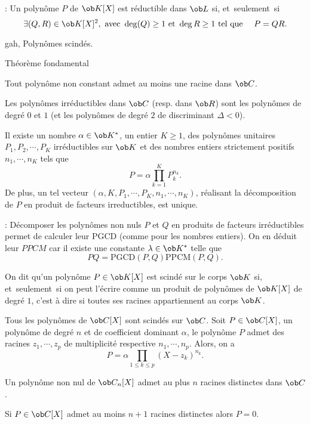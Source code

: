 \Remarque : Un polynôme $P$ de $\ob K[X]$ est réductible dans $\ob L$ si, et~seulement~si 
$$
\exists(Q,R)\in\ob K[X]^2, \mbox{ avec }\deg(Q)\ge1\mbox{ et } \deg R\ge1\mbox{ tel que }\quad P=QR.
$$
\medskip

\Subsection gah, Polynômes scindés.

\Concept [] Théorème fondamental

\Theoreme [Index=Theoreme@Théorème!de d'Alembert;Title=Théorème de d'Alembert-Gauss]  
Tout polynôme non constant admet au moins une racine dans $\ob C$. 

\Propriete []  Les polynômes irréductibles dans $\ob C$ (resp. dans $\ob R$) sont les polynômes de degré $0$ et $1$ (et les polynômes de degré $2$ de discriminant $\Delta<0$). 
\bigskip

\Theoreme [Title=Décomposition en facteurs irréductibles;$P$ polynôme non constant à coefficients dans $\ob K$ ] 
Il existe un nombre $\alpha\in\ob K^*$, un entier $K\ge1$, des polynômes unitaires $P_1,P_2,\cdots, P_K$ irréductibles sur $\ob K$ et des nombres entiers strictement positifs $n_1,\cdots, n_K$ tels que 
$$
P=\alpha\prod_{k=1}^K P_k^{n_k}. 
$$
De plus, un tel vecteur $(\alpha, K,P_1,\cdots, P_K, n_1,\cdots,n_K)$, réalisant la décomposition de $P$ en produit de facteurs irreductibles, est unique. 

\Remarque : Décomposer les polynômes non nuls $P$ et $Q$ en produits de facteurs irréductibles permet de calculer leur PGCD (comme pour les nombres entiers). 
On en déduit leur $PPCM$ car il existe une constante $\lambda\in\ob K^*$ telle que 
$$
PQ=\mbox{PGCD}(P,Q)\mbox{PPCM}(P,Q).
$$

\Definition []  On dit qu'un polynôme $P\in\ob K[X]$ est scindé sur le corps $\ob K$ si, et~seulement~si on peut l'écrire comme un produit de polynômes de $\ob K[X]$ de degré $1$, c'est à dire si toutes ses racines appartiennent au corps $\ob K$. 
\bigskip

\Propriete []  Tous les polynômes de $\ob C[X]$ sont scindés sur $\ob C$. Soit $P\in\ob C[X]$, un polynôme de degré $n$ et de coefficient dominant $\alpha$, le polynôme $P$ admet des racines $z_1,\cdots, z_p$ de multiplicité respective $n_1,\cdots, n_p$. Alors, on a 
$$
P=\alpha\prod_{1\le k\le p}(X-z_k)^{n_k}.
$$

\Propriete []  Un polynôme non nul de $\ob C_n[X]$ admet au plus $n$ racines distinctes dans $\ob C$. 
\bigskip

\Propriete []  Si $P\in\ob C[X]$ admet au moins $n+1$ racines distinctes alors $P=0$. 
\bigskip

